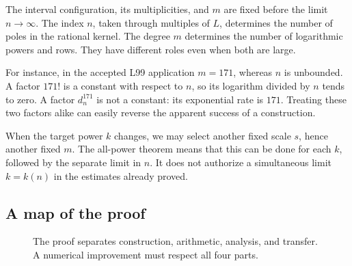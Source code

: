 The interval configuration, its multiplicities, and \(m\) are fixed
before the limit \(n\to\infty\). The index \(n\), taken through
multiples of \(L\), determines the number of poles in the rational
kernel. The degree \(m\) determines the number of logarithmic powers
and rows. They have different roles even when both are large.

For instance, in the accepted L99 application \(m=171\), whereas
\(n\) is unbounded. A factor \(171!\) is a constant with respect
to \(n\), so its logarithm divided by \(n\) tends to zero. A
factor \(d_n^{171}\) is not a constant: its exponential rate is
\(171\). Treating these two factors alike can easily reverse the
apparent success of a construction.

When the target power \(k\) changes, we may select another fixed
scale \(s\), hence another fixed \(m\). The all-power theorem means
that this can be done for each \(k\), followed by the separate
limit in \(n\). It does not authorize a simultaneous limit
\(k=k(n)\) in the estimates already proved.

\subsection{A map of the proof}

\begin{figure}[ht]
\centering
{}
\caption{The proof separates construction, arithmetic, analysis, and
transfer. A numerical improvement must respect all four parts.}
\label{fig:proofmap}
\end{figure}

